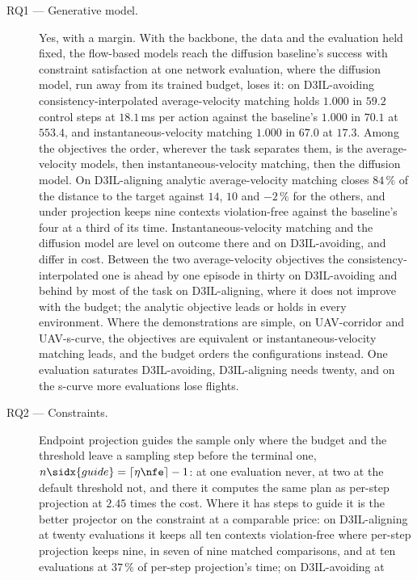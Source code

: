 \begin{description}
  \item[RQ1 --- Generative model.] Yes, with a margin. With the backbone, the data and the evaluation
    held fixed, the flow-based models reach the diffusion baseline's success with constraint
    satisfaction at one network evaluation, where the diffusion model, run away from its trained
    budget, loses it: on D3IL-avoiding consistency-interpolated average-velocity matching holds
    $1.000$ in $59.2$ control steps at $18.1$\,ms per action against the baseline's $1.000$ in $70.1$
    at $553.4$, and instantaneous-velocity matching $1.000$ in $67.0$ at $17.3$. Among the objectives
    the order, wherever the task separates them, is the average-velocity models, then
    instantaneous-velocity matching, then the diffusion model. On D3IL-aligning analytic
    average-velocity matching closes $84\,\%$ of the distance to the target against $14$, $10$ and
    $-2\,\%$ for the others, and under projection keeps nine contexts violation-free against the
    baseline's four at a third of its time. Instantaneous-velocity matching and the diffusion model
    are level on outcome there and on D3IL-avoiding, and differ in cost. Between the two
    average-velocity objectives the consistency-interpolated one is ahead by one episode in thirty on
    D3IL-avoiding and behind by most of the task on D3IL-aligning, where it does not improve with
    the budget; the analytic objective leads or holds in every environment. Where the demonstrations
    are simple, on UAV-corridor and UAV-s-curve, the objectives are equivalent or
    instantaneous-velocity matching leads, and the budget orders the configurations instead. One
    evaluation saturates D3IL-avoiding, D3IL-aligning needs twenty, and on the s-curve more
    evaluations lose flights.
  \item[RQ2 --- Constraints.] Endpoint projection guides the sample only where the budget and the
    threshold leave a sampling step before the terminal one, $n\sidx{guide} = \lceil \eta\nfe \rceil
    - 1$: at one evaluation never, at two at the default threshold not, and there it computes the same
    plan as per-step projection at $2.45$ times the cost. Where it has steps to guide it is the better
    projector on the constraint at a comparable price: on D3IL-aligning at twenty evaluations it keeps
    all ten contexts violation-free where per-step projection keeps nine, in seven of nine matched
    comparisons, and at ten evaluations at $37\,\%$ of per-step projection's time; on D3IL-avoiding at

\end{description}
